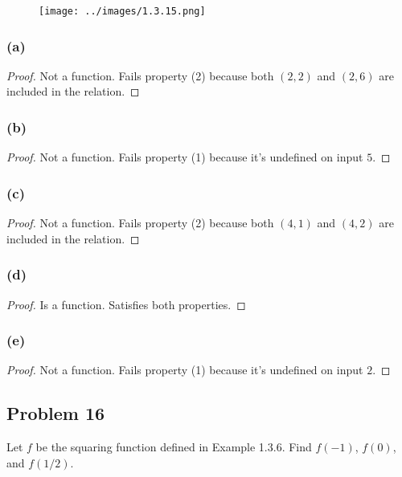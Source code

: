 \documentclass[14pt]{extarticle}
\begin{document}
\begin{figure}[ht!]
\centering
\texttt{[image: ../images/1.3.15.png]}
\end{figure}

\subsubsection{(a)}

\begin{proof}
Not a function. Fails property (2) because both $(2, 2)$ and $(2, 6)$ are
included in the relation.
\end{proof}

\subsubsection{(b)}

\begin{proof}
Not a function. Fails property (1) because it's undefined on input $5$.
\end{proof}

\subsubsection{(c)}

\begin{proof}
Not a function. Fails property (2) because both $(4, 1)$ and $(4, 2)$ are
included in the relation.
\end{proof}

\subsubsection{(d)}

\begin{proof}
Is a function. Satisfies both properties.
\end{proof}

\subsubsection{(e)}

\begin{proof}
Not a function. Fails property (1) because it's undefined on input $2$.
\end{proof}

\subsection{Problem 16}
Let $f$ be the squaring function defined in Example 1.3.6.
Find $f(-1)$, $f(0)$, and $f(1/2)$.
\end{document}
